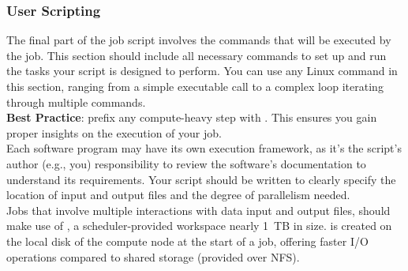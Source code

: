 \subsubsection{User Scripting}
\label{sect:scripting}
The final part of the job script involves the commands that will be executed by the job.
This section should include all necessary commands to set up and run the tasks 
your script is designed to perform. You can use any Linux command in this section, 
ranging from a simple executable call to a complex loop iterating through multiple commands.\\

\noindent \textbf{Best Practice}: prefix any compute-heavy step with .
This ensures you gain proper insights on the execution of your job.\\

\noindent Each software program may have its own execution framework, as it's the script's author (e.g., you) 
responsibility to review the software's documentation to understand its requirements.
Your script should be written to clearly specify the location of input and output files and the degree of parallelism needed.\\


\noindent Jobs that involve multiple interactions with data input and output files, should make use of , 
a scheduler-provided workspace nearly 1~TB in size.
 is created on the local disk of the compute node at the start of a job, offering faster I/O operations 
compared to shared storage (provided over NFS).


